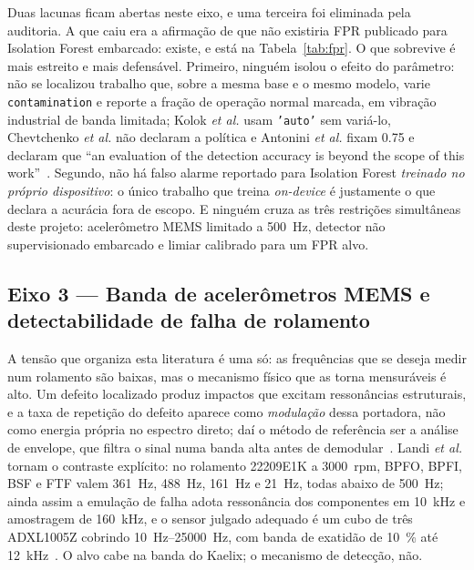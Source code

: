 \documentclass[11pt,a4paper]{article}
\begin{document}
Duas lacunas ficam abertas neste eixo, e uma terceira foi eliminada pela auditoria. A que
caiu era a afirmação de que não existiria FPR publicado para Isolation Forest embarcado:
existe, e está na Tabela~\ref{tab:fpr}. O que sobrevive é mais estreito e mais defensável.
Primeiro, ninguém isolou o efeito do parâmetro: não se localizou trabalho que, sobre a
mesma base e o mesmo modelo, varie \texttt{contamination} e reporte a fração de operação
normal marcada, em vibração industrial de banda limitada; Kolok \emph{et al.} usam
\texttt{'auto'} sem variá-lo, Chevtchenko \emph{et al.} não declaram a política e
Antonini \emph{et al.} fixam \num{0,75} e declaram que ``an evaluation of the detection
accuracy is beyond the scope of this work''~\cite{antonini2023}. Segundo, não há falso
alarme reportado para Isolation Forest \emph{treinado no próprio dispositivo}: o único
trabalho que treina \emph{on-device} é justamente o que declara a acurácia fora de escopo.
E ninguém cruza as três restrições simultâneas deste projeto: acelerômetro MEMS limitado
a \SI{500}{\hertz}, detector não supervisionado embarcado e limiar calibrado para um FPR
alvo.

\subsection{Eixo 3 --- Banda de acelerômetros MEMS e detectabilidade de falha de rolamento}

A tensão que organiza esta literatura é uma só: as frequências que se deseja medir num
rolamento são baixas, mas o mecanismo físico que as torna mensuráveis é alto. Um defeito
localizado produz impactos que excitam ressonâncias estruturais, e a taxa de repetição do
defeito aparece como \emph{modulação} dessa portadora, não como energia própria no
espectro direto; daí o método de referência ser a análise de envelope, que filtra o sinal
numa banda alta antes de demodular~\cite{randall2011}. Landi \emph{et al.} tornam o
contraste explícito: no rolamento 22209E1K a \num{3000}~rpm, BPFO, BPFI, BSF e FTF valem
\SI{361}{\hertz}, \SI{488}{\hertz}, \SI{161}{\hertz} e \SI{21}{\hertz}, todas abaixo de
\SI{500}{\hertz}; ainda assim a emulação de falha adota ressonância dos componentes em
\SI{10}{\kilo\hertz} e amostragem de \SI{160}{\kilo\hertz}, e o sensor julgado adequado é
um cubo de três ADXL1005Z cobrindo \SIrange{10}{25000}{\hertz}, com banda de exatidão de
\SI{10}{\percent} até \SI{12}{\kilo\hertz}~\cite{landi2023}. O alvo cabe na banda do
Kaelix; o mecanismo de detecção, não.
\end{document}

